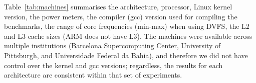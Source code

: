 

Table~\ref{tab:machines} summarises the architecture, processor, Linux kernel version, the
power meters, the compiler (gcc) version used for compiling the benchmarks, the range of
core frequencies (min-max) when using DVFS, the L2 and L3 cache sizes (ARM does not have
L3). The machines were available across multiple institutions (Barcelona Supercomputing
Center, University of Pittsburgh, and Universidade Federal da Bahia), and therefore we did
not have  control over the kernel and gcc versions; regardless, the results for each
architecture are consistent within that set of experiments. 

